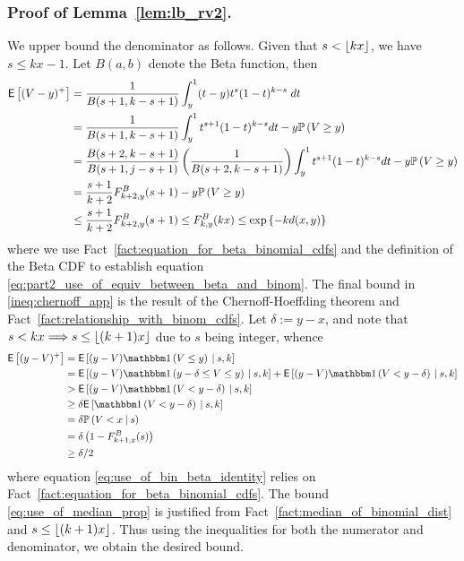 \subsubsection{Proof of Lemma~\ref{lem:lb_rv2}.} \label{prf:proof_of_lb_rv2}
\begin{myproof}[Proof.]
	We upper bound the denominator as follows. Given that $s < \lfloor k x\rfloor$, we have $s \le kx - 1$. Let $B(a,b)$ denote the Beta function, then
	\begin{align}
	\mathsf{E} \left[ (V - y)^+  \right] & = \frac{1}{B(s+1,k-s+1)}\int_{y}^1 (t-y) t^s (1-t)^{k-s} \; dt \nonumber \\
	& = \frac{1}{B(s+1,k-s+1)}\int_{y}^1 t^{s+1} (1-t)^{k-s}  dt - y \mathbb{P} \left( V \ge y \right) \nonumber \\
	& = \frac{B(s+2,k-s+1)}{B(s+1,j-s+1)}\left( \frac{1}{B(s+2,k-s+1)} \right)\int_{y}^1 t^{s+1} (1-t)^{k-s}  dt - y \mathbb{P} \left( V \ge y \right) \nonumber \\
	& = \frac{s+1}{k+2} F^B_{k+2,y}(s+1)  - y \mathbb{P} \left( V \ge y \right) \label{eq:part2_use_of_equiv_between_beta_and_binom} \\
	& \le \frac{s+1}{k+2} F^B_{k+2,y}(s+1) \le  F^B_{k,y}(k x) \le \exp\left\{- k d(x,y) \label{ineq:chernoff_app} \right\}
	\end{align}
	where we use Fact~\ref{fact:equation_for_beta_binomial_cdfs} and the definition of the Beta CDF to establish equation \eqref{eq:part2_use_of_equiv_between_beta_and_binom}. The final bound in \eqref{ineq:chernoff_app} is the result of the Chernoff-Hoeffding theorem and Fact~\ref{fact:relationship_with_binom_cdfs}. Let $\delta:=y-x$, and note that $s < kx \Longrightarrow s \le \lfloor(k+1)x\rfloor$ due to $s$ being integer, whence
	\begin{align}
	\Ee{(y - V)^+ } & =  \Ee{(y - V) \ind{V \le y} \given s, k} \nonumber \\
	& = \Ee{(y - V) \ind{y - \delta \le V \le y} \given s, k} +  \Ee{(y - V) \ind{V < y - \delta} \given s, k} \nonumber\\
	& > \Ee{(y - V) \ind{V < y - \delta} \given s, k}\nonumber \\
	& \ge \delta\Ee{\ind{V < y-\delta} \given s, k}\\
	& = \delta \P{V < x \given s} \nonumber \\
	& = \delta\left(1 - F^B_{k+1,x}(s) \right) \label{eq:use_of_bin_beta_identity}  \\
	& \ge \delta/2  \label{eq:use_of_median_prop}
	\end{align}
	where equation \eqref{eq:use_of_bin_beta_identity} relies on Fact~\ref{fact:equation_for_beta_binomial_cdfs}. The bound \eqref{eq:use_of_median_prop} is justified from Fact~\ref{fact:median_of_binomial_dist} and $s \le \lfloor(k+1) x\rfloor$. Thus using the inequalities for both the numerator and denominator, we obtain the desired bound.
\end{myproof}
